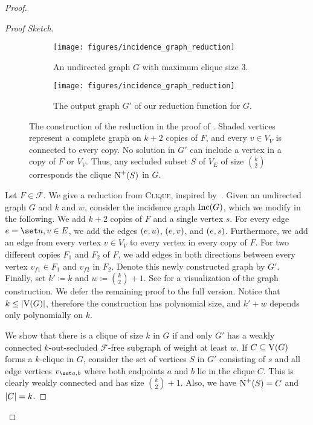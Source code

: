 \restateffree*
\iflong \begin{proof}
\else \begin{proof}[Proof Sketch]
\fi
\begin{figure}
  \centering
  \hfill
  \begin{subfigure}{0.3\textwidth}
    \centering
    \texttt{[image: figures/incidence\_graph\_reduction]}
    \caption{An undirected graph $G$ with maximum clique size 3.}
  \end{subfigure}
  \hfill
  \begin{subfigure}{0.54\textwidth}
    \centering
    \texttt{[image: figures/incidence\_graph\_reduction]}
    \caption{The output graph $G'$ of our reduction function for $G$.}
  \end{subfigure}
  \hfill
  \caption{The construction of the reduction in the proof of . Shaded vertices represent a complete graph on $k+2$ copies of $F$, and every $v \in V_V$ is connected to every copy. No solution in $G'$ can include a vertex in a copy of $F$ or $V_V$. Thus, any secluded subset $S$ of $V_E$ of size $\binom{k}{2}$ corresponds the clique $\operatorname{\operatorname{N}^+}({S})$ in $G$.}\label{fig:clique_reduction}
\end{figure}

    Let $F \in \mathcal{F}$. We give a reduction from \textsc{Clique}, inspired by~\cite{fomin2013parameterized}. Given an undirected graph $G$ and $k$ and $w$, consider the incidence graph $\textrm{Inc}({G})$, which we modify in the following. We add $k+2$ copies of $F$ and a single vertex $s$. For every edge $e = \uned{u}{v} \in E$, we add the edges $({e}, {u})$, $({e}, {v})$, and $({e}, {s})$. Furthermore, we add an edge from every vertex $v \in V_V$ to every vertex in every copy of $F$. For two different copies $F_1$ and $F_2$ of $F$, we add edges in both directions between every vertex $v_{f1} \in F_1$ and $v_{f2}$ in $F_2$. Denote this newly constructed graph by $G'$. Finally, set $k' \coloneqq k$ and $w \coloneqq \binom{k}{2} + 1$.
    See  for a visualization of the graph construction.
\ifshort
    We defer the remaining proof to the full version.
\else
    Notice that $k \le \abs{\ve{G}}$, therefore the construction has polynomial size, and $k' + w$ depends only polynomially on $k$.

    We show that there is a clique of size $k$ in $G$ if and only $G'$ has a weakly connected $k$-out-secluded $\mathcal{F}$-free subgraph of weight at least $w$.
    If $C \subseteq \operatorname{V}({G})$ forms a $k$-clique in $G$, consider the set of vertices $S$ in $G'$ consisting of $s$ and all edge vertices $v_{\uned{a}{b}}$ where both endpoints $a$ and $b$ lie in the clique $C$. This is clearly weakly connected and has size $\binom{k}{2}+1$. Also, we have $\operatorname{\operatorname{N}^+}({S}) = C$ and $\abs{C} = k$.


\end{proof}
\end{proof}
